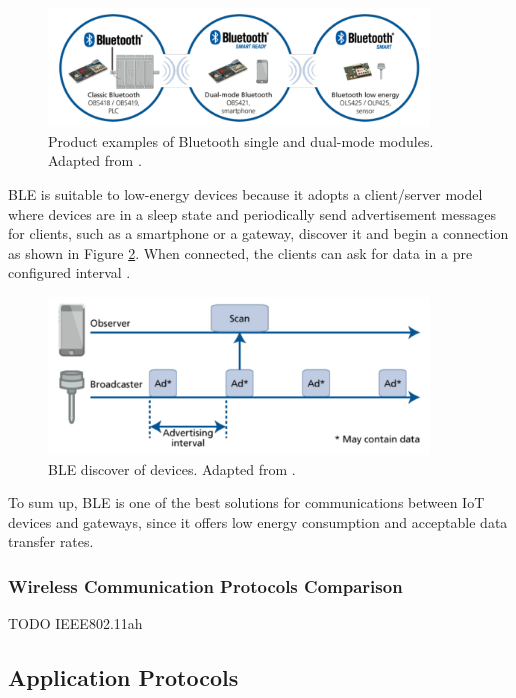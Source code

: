 \begin{figure}[H]
	\centering
	\includegraphics[width=0.9\textwidth]{figures/ble.png}
	\caption{Product examples of Bluetooth single and dual-mode modules. Adapted from \cite{Andersson2014}.}
	\label{fig:ble1}
\end{figure}

BLE is suitable to low-energy devices because it adopts a client/server model where devices are in a sleep state and periodically send advertisement messages for clients, such as a smartphone or a gateway, discover it and begin a connection as shown in Figure \ref{fig:ble2}. When connected, the clients can ask for data in a pre configured interval \cite{Andersson2014}. 

\begin{figure}[H]
	\centering
	\includegraphics[width=0.9\textwidth]{figures/ble2.png}
	\caption{BLE discover of devices. Adapted from \cite{Andersson2014}.}
	\label{fig:ble2}
\end{figure}

To sum up, BLE is one of the best solutions for communications between IoT devices and gateways, since it offers low energy consumption and acceptable data transfer rates.

\subsubsection{Wireless Communication Protocols Comparison}
TODO  
IEEE802.11ah
\subsection{Application Protocols}

